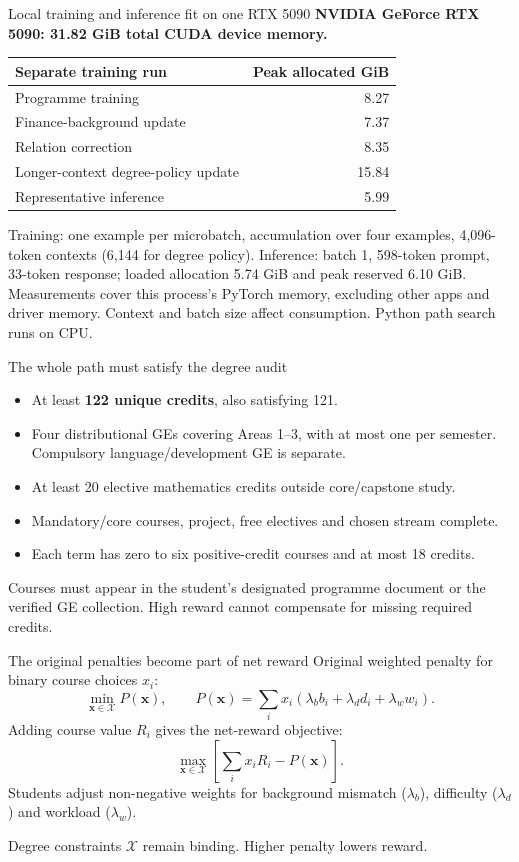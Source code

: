 \documentclass[aspectratio=169,11pt]{beamer}
\newcommand{\smallnote}[1]{\par{\footnotesize\color{muted}#1\par}}
\begin{document}
\begin{frame}{Local training and inference fit on one RTX 5090}
\textbf{NVIDIA GeForce RTX 5090: 31.82 GiB total CUDA device memory.}
\vspace{1mm}
\begin{tabular}{L{9cm}r}
\toprule
Separate training run & Peak allocated GiB\\\midrule
Programme training & 8.27\\
Finance-background update & 7.37\\
Relation correction & 8.35\\
Longer-context degree-policy update & 15.84\\\midrule
Representative inference & 5.99\\
\bottomrule
\end{tabular}\par
\smallnote{Training: one example per microbatch, accumulation over four examples, 4,096-token contexts (6,144 for degree policy). Inference: batch 1, 598-token prompt, 33-token response; loaded allocation 5.74 GiB and peak reserved 6.10 GiB. Measurements cover this process's PyTorch memory, excluding other apps and driver memory. Context and batch size affect consumption. Python path search runs on CPU.}
\end{frame}

\begin{frame}{The whole path must satisfy the degree audit}
\begin{itemize}\setlength{\itemsep}{5pt}
\item At least \textbf{122 unique credits}, also satisfying 121.
\item Four distributional GEs covering Areas 1--3, with at most one per semester. Compulsory language/development GE is separate.
\item At least 20 elective mathematics credits outside core/capstone study.
\item Mandatory/core courses, project, free electives and chosen stream complete.
\item Each term has zero to six positive-credit courses and at most 18 credits.
\end{itemize}
\smallnote{Courses must appear in the student's designated programme document or the verified GE collection. High reward cannot compensate for missing required credits.}
\end{frame}

\begin{frame}{The original penalties become part of net reward}
Original weighted penalty for binary course choices $x_i$:
\[
\min_{\mathbf x\in\mathcal X}P(\mathbf x),\qquad
P(\mathbf x)=\sum_i x_i(\lambda_b b_i+\lambda_d d_i+\lambda_w w_i).
\]
Adding course value $R_i$ gives the net-reward objective:
\[
\max_{\mathbf x\in\mathcal X}\left[\sum_i x_iR_i-P(\mathbf x)\right].
\]
\vspace{1mm}
Students adjust non-negative weights for background mismatch ($\lambda_b$), difficulty ($\lambda_d$) and workload ($\lambda_w$).
\smallnote{Degree constraints $\mathcal X$ remain binding. Higher penalty lowers reward.}
\end{frame}
\end{document}
